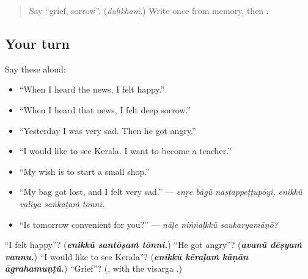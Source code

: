 \label{lesson:ML-R345-feelings-and-hopes}



\begin{quote}
Say \textquotedblleft{}grief, sorrow\textquotedblright{}. (\emph{duḥkhaṁ}.) Write \textbf{} once from memory, then \textbf{}.
\end{quote}

\subsection*{Your turn}
Say these aloud:

\begin{itemize}
\raggedright
  \item \textquotedblleft{}When I heard the news, I felt happy.\textquotedblright{}
  \item \textquotedblleft{}When I heard that news, I felt deep sorrow.\textquotedblright{}
  \item \textquotedblleft{}Yesterday I was very sad. Then he got angry.\textquotedblright{}
  \item \textquotedblleft{}I would like to see Kerala. I want to become a teacher.\textquotedblright{}
  \item \textquotedblleft{}My wish is to start a small shop.\textquotedblright{}
  \item \textquotedblleft{}My bag got lost, and I felt very sad.\textquotedblright{} — \emph{enṟe bāgŭ naṣṭappeṭṭupōyi, enikkŭ valiya saṅkaṭaṁ tōnni.}
  \item \textquotedblleft{}Is tomorrow convenient for you?\textquotedblright{} — \emph{nāḷe niṅṅaḷkkŭ saukaryamāṇō?}
\end{itemize}

\begin{tcolorbox}[breakable,colback=teal!4,colframe=teal!35!black,title={Before you move on}]
\textquotedblleft{}I felt happy\textquotedblright{}? (\emph{\textbf{enikkŭ santōṣaṁ tōnni.}}) \textquotedblleft{}He got angry\textquotedblright{}? (\emph{\textbf{avanŭ dēṣyaṁ vannu.}}) \textquotedblleft{}I would like to see Kerala\textquotedblright{}? (\emph{\textbf{enikkŭ kēraḷaṁ kāṇān āgrahamuṇṭŭ.}}) \textquotedblleft{}Grief\textquotedblright{}? (\textbf{}, with the visarga \textbf{}.)
\end{tcolorbox}
